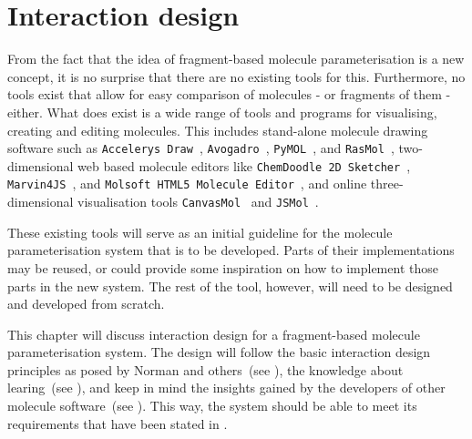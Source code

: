 \chapter{Interaction design}

From the fact that the idea of fragment-based molecule parameterisation is a new concept, it is no surprise that there are no existing tools for this. Furthermore, no tools exist that allow for easy comparison of molecules - or fragments of them - either. What does exist is a wide range of tools and programs for visualising, creating and editing molecules. This includes stand-alone molecule drawing software such as \verb|Accelerys Draw|~\cite{accelrys2012accelrys}, \verb|Avogadro|~\cite{hanwell2012avogadro}, \verb|PyMOL|~\cite{delano2002pymol}, and \verb|RasMol|~\cite{pembroke2000bio}, two-dimensional web based molecule editors like \verb|ChemDoodle 2D Sketcher|~\cite{ichemlabs2013chemdoodle}, \verb|Marvin4JS|~\cite{chemxon2013marvin}, and \verb|Molsoft HTML5 Molecule Editor|~\cite{molsoft2012molsoft}, and online three-dimensional visualisation tools \verb|CanvasMol|~\cite{altered2013canvasmol} and \verb|JSMol|~\cite{hanson2013jsmol}.

These existing tools will serve as an initial guideline for the molecule parameterisation system that is to be developed. Parts of their implementations may be reused, or could provide some inspiration on how to implement those parts in the new system. The rest of the tool, however, will need to be designed and developed from scratch.

This chapter will discuss interaction design for a fragment-based molecule parameterisation system. The design will follow the basic interaction design principles as posed by Norman and others~(see ), the knowledge about learing~(see ), and keep in mind the insights gained by the developers of other molecule software~(see ). This way, the system should be able to meet its requirements that have been stated in .


